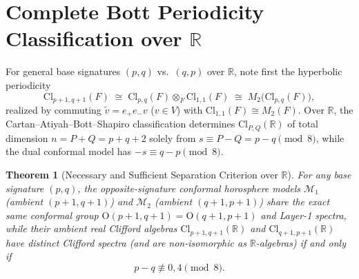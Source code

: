 \documentclass[11pt]{article}
\newtheorem{theorem}{Theorem}[section]
\theoremstyle{definition}
\newcommand{\Cl}{\mathrm{Cl}}
\newcommand{\Orth}{\mathrm{O}}
\begin{document}
\section{Complete Bott Periodicity Classification over \texorpdfstring{$\mathbb{R}$}{R}}

For general base signatures $(p, q)$ vs.\ $(q, p)$ over $\mathbb{R}$, note first the hyperbolic periodicity
\[
  \Cl_{p+1, q+1}(F) \;\cong\; \Cl_{p, q}(F) \otimes_F \Cl_{1,1}(F) \;\cong\; M_2\bigl(\Cl_{p, q}(F)\bigr),
\]
realized by commuting $\tilde{v} = e_+ e_- v$ ($v \in V$) with $\Cl_{1,1}(F) \cong M_2(F)$. Over $\mathbb{R}$, the Cartan--Atiyah--Bott--Shapiro classification determines $\Cl_{P, Q}(\mathbb{R})$ of total dimension $n = P + Q = p + q + 2$ solely from $s \equiv P - Q = p - q \pmod{8}$, while the dual conformal model has $-s \equiv q - p \pmod{8}$.

\begin{theorem}[Necessary and Sufficient Separation Criterion over $\mathbb{R}$]\label{thm:bott}
For any base signature $(p, q)$, the opposite-signature conformal horosphere models $\mathcal{M}_1$ (ambient $(p+1, q+1)$) and $\mathcal{M}_2$ (ambient $(q+1, p+1)$) share the exact same conformal group $\Orth(p+1, q+1) = \Orth(q+1, p+1)$ and Layer-1 spectra, while their ambient real Clifford algebras $\Cl_{p+1, q+1}(\mathbb{R})$ and $\Cl_{q+1, p+1}(\mathbb{R})$ have distinct Clifford spectra (and are non-isomorphic as $\mathbb{R}$-algebras) if and only if
\[
  p - q \not\equiv 0, 4 \pmod{8}.
\]
\end{theorem}
\end{document}

